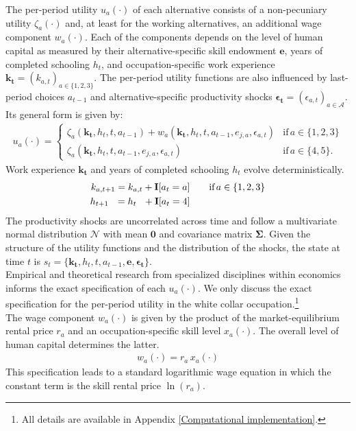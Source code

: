 \noindent The per-period utility $u_a(\cdot)$ of each alternative consists of a non-pecuniary utility $\zeta_a(\cdot)$ and, at least for the working alternatives, an additional wage component $w_a(\cdot)$. Each of the components depends on the level of human capital as measured by their alternative-specific skill endowment $\bm{e}$, years of completed schooling $h_t$, and occupation-specific work experience $\bm{k_t} = \left(k_{a,t}\right)_{a\in\{1, 2, 3\}}$. The per-period utility functions are also influenced by last-period choices $a_{t -1}$ and alternative-specific productivity shocks $\bm{\epsilon_t} = \left(\epsilon_{a,t}\right)_{a\in\mathcal{A}}$. Its general form is given by:
%
\begin{align*}
u_a(\cdot) =
\begin{cases}
    \zeta_a(\bm{k_t}, h_t, t, a_{t -1})  + w_a(\bm{k_t}, h_t, t, a_{t -1}, e_{j, a}, \epsilon_{a,t})                & \text{if}\, a \in \{1, 2, 3\}  \\
    \zeta_a(\bm{k_t}, h_t, t, a_{t-1}, e_{j,a}, \epsilon_{a,t})                                                  &  \text{if}\, a \in \{4, 5\}.
\end{cases}
\end{align*}
%
\noindent Work experience $\bm{k_t}$  and years of completed schooling $h_t$ evolve deterministically.
%
\begin{align*}
k_{a,t+1} = k_{a,t} + {\textbf{I}}[a_t = a]  &\qquad \text{if}\, a \in \{1, 2, 3\} \\
h_{t + 1\phantom{,a}} = h_{t\phantom{,a}} +   {\textbf{I}}[a_t = 4]  &\qquad
\end{align*}
%
\noindent The productivity shocks are uncorrelated across time and follow a multivariate normal distribution $\mathcal{N}$ with mean $\bm{0}$ and covariance matrix $\bm{\Sigma}$. Given the structure of the utility functions and the distribution of the shocks, the state at time $t$ is $s_t = \{\bm{k_t}, h_t, t, a_{t -1}, \bm{e},\bm{\epsilon_t}\}$.\\

\noindent Empirical and theoretical research from specialized disciplines within economics informs the exact specification of each $u_a(\cdot)$. We only discuss the exact specification for the per-period utility in the white collar occupation.\footnote{All details are available in Appendix \ref{Computational implementation}.}\\

\noindent The wage component $w_{a}(\cdot)$ is given by the product of the market-equilibrium rental price $r_{a}$ and an occupation-specific skill level $x_{a}(\cdot)$. The overall level of human capital determines the latter.
%
\begin{align*}
w_{a}(\cdot) = r_{a} \, x_{a}(\cdot)
\end{align*}
%
This specification leads to a standard logarithmic wage equation in which the constant term is the skill rental price $\ln(r_{a})$.\\

